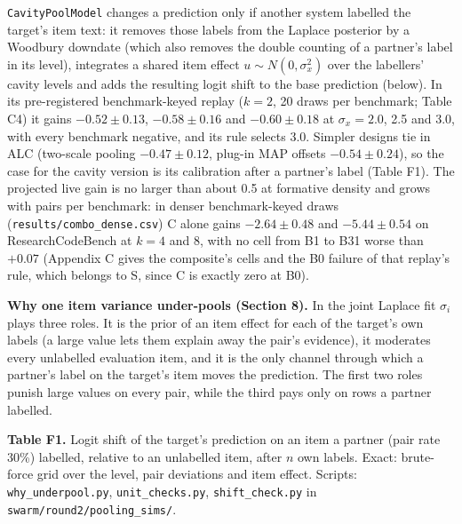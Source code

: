 \documentclass[
]{article}
\begin{document}
\texttt{CavityPoolModel} changes a prediction only if another system
labelled the target's item text: it removes those labels from the
Laplace posterior by a Woodbury downdate (which also removes the double
counting of a partner's label in its level), integrates a shared item
effect \(u \sim N(0, \sigma_x^2)\) over the labellers' cavity levels and
adds the resulting logit shift to the base prediction (below). In its
pre-registered benchmark-keyed replay (\(k = 2\), 20 draws per
benchmark; Table C4) it gains \(-0.52 \pm 0.13\), \(-0.58 \pm 0.16\) and
\(-0.60 \pm 0.18\) at \(\sigma_x = 2.0\), 2.5 and 3.0, with every
benchmark negative, and its rule selects 3.0. Simpler designs tie in ALC
(two-scale pooling \(-0.47 \pm 0.12\), plug-in MAP offsets
\(-0.54 \pm 0.24\)), so the case for the cavity version is its
calibration after a partner's label (Table F1). The projected live gain
is no larger than about 0.5 at formative density and grows with pairs
per benchmark: in denser benchmark-keyed draws
(\texttt{results/combo\_dense.csv}) C alone gains \(-2.64 \pm 0.48\) and
\(-5.44 \pm 0.54\) on ResearchCodeBench at \(k = 4\) and 8, with no cell
from B1 to B31 worse than \(+0.07\) (Appendix C gives the composite's
cells and the B0 failure of that replay's rule, which belongs to S,
since C is exactly zero at B0).

\textbf{Why one item variance under-pools (Section 8).} In the joint
Laplace fit \(\sigma_i\) plays three roles. It is the prior of an item
effect for each of the target's own labels (a large value lets them
explain away the pair's evidence), it moderates every unlabelled
evaluation item, and it is the only channel through which a partner's
label on the target's item moves the prediction. The first two roles
punish large values on every pair, while the third pays only on rows a
partner labelled.

\textbf{Table F1.} Logit shift of the target's prediction on an item a
partner (pair rate 30\%) labelled, relative to an unlabelled item, after
\(n\) own labels. Exact: brute-force grid over the level, pair
deviations and item effect. Scripts: \texttt{why\_underpool.py},
\texttt{unit\_checks.py}, \texttt{shift\_check.py} in
\texttt{swarm/round2/pooling\_sims/}.
\end{document}
